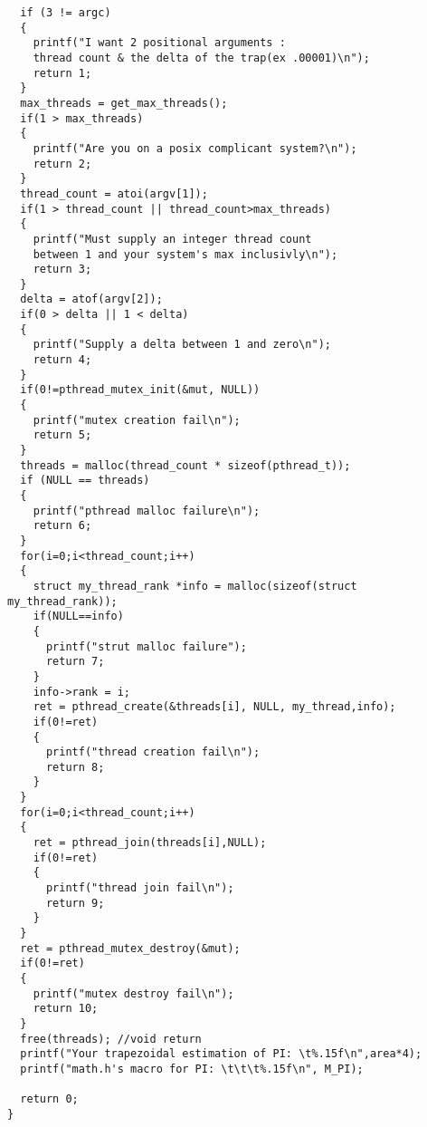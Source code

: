 \documentclass{article}
\begin{document}
\begin{lstlisting}
  if (3 != argc)
  {
    printf("I want 2 positional arguments : 
    thread count & the delta of the trap(ex .00001)\n");
    return 1;
  }
  max_threads = get_max_threads();
  if(1 > max_threads)
  {
    printf("Are you on a posix complicant system?\n");
    return 2;
  }
  thread_count = atoi(argv[1]);
  if(1 > thread_count || thread_count>max_threads)
  {
    printf("Must supply an integer thread count 
    between 1 and your system's max inclusivly\n");
    return 3;
  }
  delta = atof(argv[2]);
  if(0 > delta || 1 < delta)
  {
    printf("Supply a delta between 1 and zero\n");
    return 4;
  }
  if(0!=pthread_mutex_init(&mut, NULL))
  {
    printf("mutex creation fail\n");
    return 5;
  }
  threads = malloc(thread_count * sizeof(pthread_t));
  if (NULL == threads)
  {
    printf("pthread malloc failure\n");
    return 6;
  }
  for(i=0;i<thread_count;i++)
  {
    struct my_thread_rank *info = malloc(sizeof(struct my_thread_rank));
    if(NULL==info)
    {
      printf("strut malloc failure");
      return 7;
    }
    info->rank = i;
    ret = pthread_create(&threads[i], NULL, my_thread,info);
    if(0!=ret)
    {
      printf("thread creation fail\n");
      return 8;
    }
  }
  for(i=0;i<thread_count;i++)
  {
    ret = pthread_join(threads[i],NULL);
    if(0!=ret)
    {
      printf("thread join fail\n");
      return 9;
    }
  }
  ret = pthread_mutex_destroy(&mut);  
  if(0!=ret)
  {
    printf("mutex destroy fail\n");
    return 10;
  }
  free(threads); //void return
  printf("Your trapezoidal estimation of PI: \t%.15f\n",area*4);
  printf("math.h's macro for PI: \t\t\t%.15f\n", M_PI);

  return 0;
}

\end{lstlisting}
\end{document}
